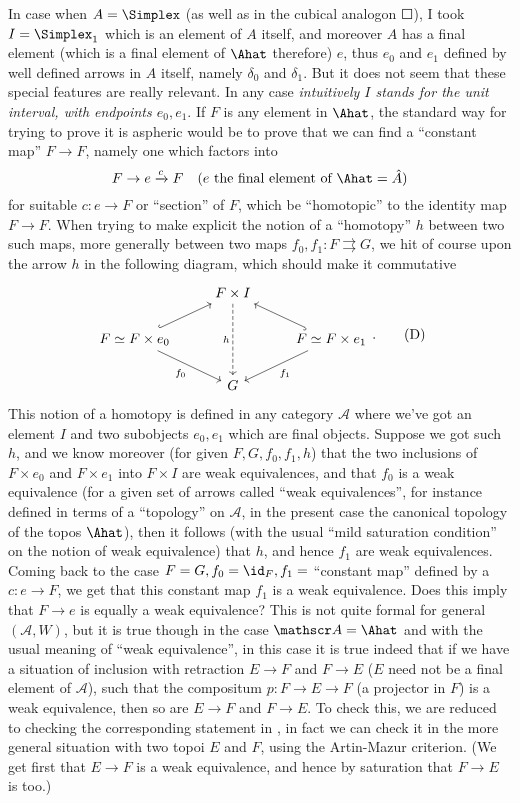 In case when $A=\Simplex$ (as well as in the cubical analogon
$\Square$), I took $I=\Simplex_1$ which is an element of $A$ itself, and
moreover $A$ has a final element (which is a final element of
$\Ahat$ therefore) $e$, thus $e_0$ and $e_1$ defined by well
defined arrows in $A$ itself, namely $\delta_0$ and $\delta_1$. But it
does not seem that these special features are really relevant. In any
case \emph{intuitively $I$ stands for the unit interval, with
  endpoints $e_0,e_1$}. If $F$ is any element in $\Ahat$, the
standard way for trying to prove it is aspheric would be to prove that
we can find a ``constant map'' $F \to F$, namely one which factors
into
\[ F \to e \xrightarrow c F\quad\text{($e$ the final element of $\Ahat = \hat{A}$)}\]
for suitable $c : e \to F$ or ``section'' of $F$, which be
``homotopic'' to the identity map $F \to F$. When trying to make
explicit the notion of a ``homotopy'' $h$ between two such maps, more
generally between two maps $f_0,f_1 : F \rightrightarrows G$, we hit
of course upon the arrow $h$ in the following diagram, which should
make it commutative
\begin{equation}
  \label{eq:31.D}
  \begin{tikzcd}
    & F \times I \ar[dd, dashed, swap, "h"] & \\
    F \simeq F \times e_0 \ar[ur, hook] \ar[dr, swap, "f_0"] & &
    F \simeq F \times e_1 \ar[ul, hook] \ar[dl, "f_1"] \\
    & G &
  \end{tikzcd}.
  \tag{D}
\end{equation}
This notion of a homotopy is defined in any category $\mathscr A$
where we've got an element $I$ and two subobjects $e_0,e_1$ which are
final objects. Suppose we got such $h$, and we know moreover (for
given $F,G,f_0,f_1,h$) that the two inclusions of $F \times e_0$ and
$F\times e_1$ into $F \times I$ are weak equivalences, and that $f_0$
is a weak equivalence (for a given set of arrows called ``weak
equivalences'', for instance defined in terms of a ``topology'' on
$\mathscr A$, in the present case the canonical topology of the topos
$\Ahat$), then it follows (with the usual ``mild saturation
condition'' on the notion of weak equivalence) that $h$, and hence
$f_1$ are weak equivalences. Coming back to the case
$F=G, f_0=\id_F, f_1=$ ``constant map'' defined by a $c : e \to F$, we
get that this constant map $f_1$ is a weak equivalence. Does this
imply that $F \to e$ is equally a weak equivalence? This is not quite
formal for general $(\mathscr A,W)$, but it is true though in the case
$\mathscr A = \Ahat$ and with the usual meaning of
``weak equivalence'', in this case it is true indeed
that if we have a situation of inclusion with retraction $E \to F$ and
$F \to E$ ($E$ need not be a final element of $\mathscr A$), such that
the compositum $p : F \to E \to F$ (a projector in $F$) is a weak
equivalence, then so are $E \to F$ and $F \to E$. To check this, we
are reduced to checking the corresponding statement in \Cat, in fact
we can check it in the more general situation with two topoi $E$ and
$F$, using the Artin-Mazur criterion. (We get first that $E\to F$ is a
weak equivalence, and hence by saturation that $F\to E$ is too.)

